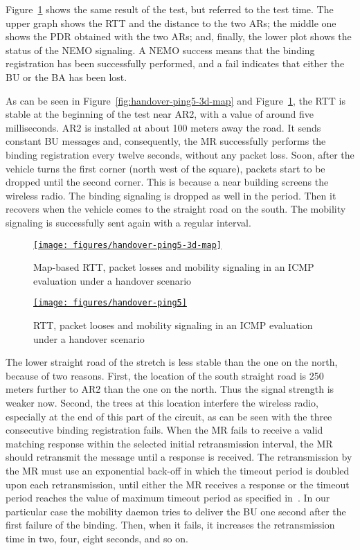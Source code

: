 \documentclass[fonts]{icst}
\begin{document}
Figure~\ref{fig:handover-ping5} shows the same result of the test, but referred
to the test time. The upper graph shows the RTT and the distance to the two ARs;
the middle one shows the PDR obtained with the two ARs; and, finally, the lower
plot shows the status of the NEMO signaling. A NEMO success means that the
binding registration has been successfully performed, and a fail indicates that
either the BU or the BA has been lost.

As can be seen in Figure~\ref{fig:handover-ping5-3d-map} and
Figure~\ref{fig:handover-ping5}, the RTT is stable at the beginning of the test
near AR2, with a value of around five milliseconds. AR2 is installed at about
100 meters away the road. It sends constant BU messages and, consequently, the
MR successfully performs the binding registration every twelve seconds, without
any packet loss. Soon, after the vehicle turns the first corner (north west of
the square), packets start to be dropped until the second corner. This is
because a near building screens the wireless radio. The binding signaling is
dropped as well in the period. Then it recovers when the vehicle comes to the
straight road on the south. The mobility signaling is successfully sent again
with a regular interval.

\begin{figure}[htbp]
   \begin{center}
    \href{http://anavanet.net/demo-vienna/?analysis=1296754401}{
       \texttt{[image: figures/handover-ping5-3d-map]}}
      \caption{Map-based RTT, packet losses and mobility signaling in an ICMP evaluation under a handover scenario}
      \label{fig:handover-ping5-3d-map}
    \href{http://anavanet.net/demo-vienna/?analysis=1296754401}{
    \texttt{[image: figures/handover-ping5]}}
      \caption{RTT, packet looses and mobility signaling in an ICMP evaluation under a handover scenario}
      \label{fig:handover-ping5}
  \end{center}
\end{figure}


The lower straight road of the stretch is less stable than the one on the north,
because of two reasons. First, the location of the south straight road is 250
meters further to AR2 than the one on the north. Thus the signal strength is
weaker now. Second, the trees at this location interfere the wireless radio,
especially at the end of this part of the circuit, as can be seen with the three
consecutive binding registration fails.
When the MR fails to receive a valid matching response within the selected
initial retransmission interval, the MR should retransmit the message until a
response is received. The retransmission by the MR must use an exponential
back-off in which the timeout period is doubled upon each retransmission, until
either the MR receives a response or the timeout period reaches the value of
maximum timeout period as specified in~\cite{rfc6275}. In our particular case
the mobility daemon tries to deliver the BU one second after the first failure
of the binding. Then, when it fails, it increases the retransmission time in
two, four, eight seconds, and so on. 
\end{document}
